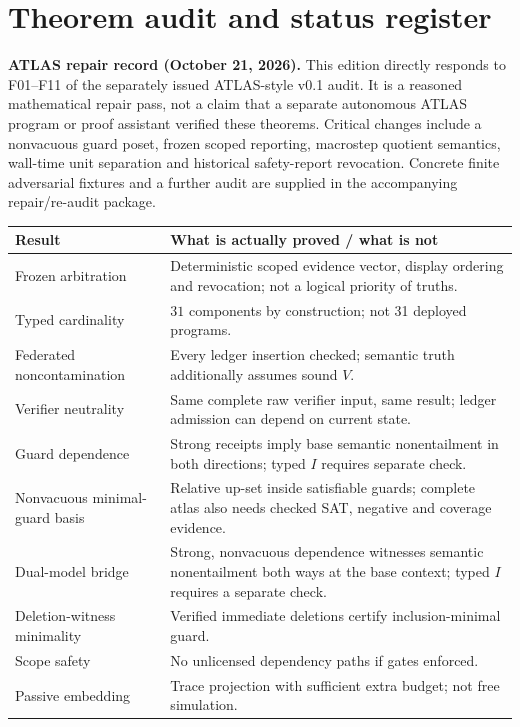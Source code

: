 \documentclass[11pt,letterpaper,oneside]{book}
\theoremstyle{definition}
\theoremstyle{remark}
\begin{document}
\appendix
\chapter{Theorem audit and status register}
\noindent\textbf{ATLAS repair record (October 21, 2026).}
This edition directly responds to F01--F11 of the separately issued
ATLAS-style v0.1 audit. It is a reasoned mathematical repair pass,
not a claim that a separate autonomous ATLAS program or proof assistant
verified these theorems. Critical changes include a nonvacuous guard
poset, frozen scoped reporting, macrostep quotient semantics,
wall-time unit separation and historical safety-report revocation.
Concrete finite adversarial fixtures and a further audit are supplied
in the accompanying repair/re-audit package.\par\medskip
\small
\begin{longtable}{>{\raggedright\arraybackslash}p{}>{\raggedright\arraybackslash}p{}}
\toprule
Result & What is actually proved / what is not\\\midrule\endhead
Frozen arbitration & Deterministic scoped evidence vector, display ordering and revocation; not a logical priority of truths.\\
Typed cardinality & $31$ components by construction; not 31 deployed programs.\\
Federated noncontamination & Every ledger insertion checked; semantic truth additionally assumes sound $V$.\\
Verifier neutrality & Same complete raw verifier input, same result; ledger admission can depend on current state.\\
Guard dependence & Strong receipts imply base semantic nonentailment in both directions; typed $I$ requires separate check.\\
Nonvacuous minimal-guard basis & Relative up-set inside satisfiable guards; complete atlas also needs checked SAT, negative and coverage evidence.\\
Dual-model bridge & Strong, nonvacuous dependence witnesses semantic nonentailment both ways at the base context; typed $I$ requires a separate check.\\
Deletion-witness minimality & Verified immediate deletions certify inclusion-minimal guard.\\
Scope safety & No unlicensed dependency paths if gates enforced.\\
Passive embedding & Trace projection with sufficient extra budget; not free simulation.\\

\end{longtable}
\end{document}
